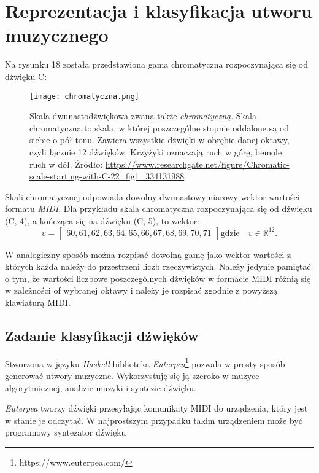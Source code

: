 \chapter{Reprezentacja i klasyfikacja utworu muzycznego}

Na rysunku 18 została przedstawiona gama chromatyczna rozpoczynająca się od dźwięku C:
\begin{figure}[H]
\texttt{[image: chromatyczna.png]}
\centering
\caption{Skala dwunastodźwiękowa zwana także  \textit{chromatyczną}. Skala chromatyczna to skala, w której poszczególne stopnie oddalone są od siebie o pół tonu. Zawiera wszystkie dźwięki w obrębie danej oktawy, czyli łącznie 12 dźwięków. Krzyżyki oznaczają ruch w górę, bemole ruch w dół. Źródło: \url{https://www.researchgate.net/figure/Chromatic-scale-starting-with-C-22_fig1_334131988}}
\centering
\end{figure}
Skali chromatycznej odpowiada dowolny dwunastowymiarowy wektor wartości formatu \textit{MIDI}. Dla przykładu skala chromatyczna rozpoczynająca się od dźwięku (C, 4), a kończąca się na dźwięku (C, 5), to wektor:
\begin{equation*}
v =
\begin{bmatrix}
60,61,62,63,64,65,66,67,68,69,70,71
\end{bmatrix}
\text{gdzie} \quad v \in \mathbb{R}^{12}.
\end{equation*}

W analogiczny sposób można rozpisać dowolną gamę jako wektor wartości z których każda należy do przestrzeni liczb rzeczywistych. Należy jedynie pamiętać o tym, że wartości liczbowe poszczególnych dźwięków w formacie MIDI różnią się  w zależności of wybranej oktawy i należy je rozpisać zgodnie z powyższą klawiaturą MIDI.



\section{Zadanie klasyfikacji dźwięków}

Stworzona w języku \textit{Haskell} biblioteka \textit{Euterpea}\footnote{https://www.euterpea.com/} pozwala w prosty sposób generować utwory muzyczne. Wykorzystuję się ją szeroko w muzyce algorytmicznej, analizie muzyki i syntezie dźwięku.

\textit{Euterpea} tworzy dźwięki przesyłając komunikaty MIDI do urządzenia, który jest w stanie je odczytać. W najprostszym przypadku takim urządzeniem może być programowy syntezator dźwięku \citep{Obrebski2020}


